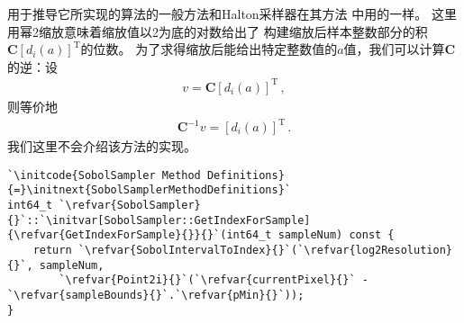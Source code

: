 用于推导它所实现的算法的一般方法和Halton采样器在其方法\linebreak
{}中用的一样。
这里用幂2缩放意味着缩放值以2为底的对数给出了
构建缩放后样本整数部分的积${\bm C}[d_i(a)]^{\mathrm{T}}$的位数。
为了求得缩放后能给出特定整数值的$a$值，我们可以计算$\bm C$的逆：设
\begin{align*}
    v={\bm C}[d_i(a)]^{\mathrm{T}}\, ,
\end{align*}
则等价地
\begin{align*}
    {\bm C}^{-1}v=[d_i(a)]^{\mathrm{T}}\, .
\end{align*}
我们这里不会介绍该方法的实现。
\begin{lstlisting}
`\initcode{SobolSampler Method Definitions}{=}\initnext{SobolSamplerMethodDefinitions}`
int64_t `\refvar{SobolSampler}{}`::`\initvar[SobolSampler::GetIndexForSample]{\refvar{GetIndexForSample}{}}{}`(int64_t sampleNum) const {
    return `\refvar{SobolIntervalToIndex}{}`(`\refvar{log2Resolution}{}`, sampleNum,
        `\refvar{Point2i}{}`(`\refvar{currentPixel}{}` - `\refvar{sampleBounds}{}`.`\refvar{pMin}{}`));
}
\end{lstlisting}